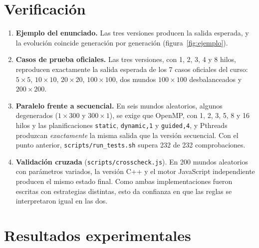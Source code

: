 \documentclass[11pt,a4paper]{article}
\begin{document}
\section{Verificación}\label{sec:verificacion}
\begin{enumerate}[nosep]
  \item \textbf{Ejemplo del enunciado.} Las tres versiones producen la salida esperada, y la evolución
    coincide generación por generación (figura~\ref{fig:ejemplo}).
  \item \textbf{Casos de prueba oficiales.} Las tres versiones, con 1, 2, 3, 4 y 8 hilos, reproducen
    exactamente la salida esperada de los 7 casos oficiales del curso: $5\times5$, $10\times10$,
    $20\times20$, $100\times100$, dos mundos $100\times100$ desbalanceados y $200\times200$.
  \item \textbf{Paralelo frente a secuencial.} En seis mundos aleatorios, algunos degenerados ($1\times300$ y
    $300\times1$), se exige que OpenMP, con 1, 2, 3, 5, 8 y 16 hilos y las planificaciones \texttt{static},
    \texttt{dynamic,1} y \texttt{guided,4}, y Pthreads produzcan \emph{exactamente} la misma salida que la
    versión secuencial. Con el punto anterior, \texttt{scripts/run\_tests.sh} supera 232 de 232
    comprobaciones.
  \item \textbf{Validación cruzada} (\texttt{scripts/crosscheck.js}). En 200 mundos aleatorios con
    parámetros variados, la versión C++ y el motor JavaScript independiente producen el mismo estado final.
    Como ambas implementaciones fueron escritas con estrategias distintas, esto da confianza en que las
    reglas se interpretaron igual en las dos.
\end{enumerate}

\section{Resultados experimentales}\label{sec:resultados}
\end{document}
